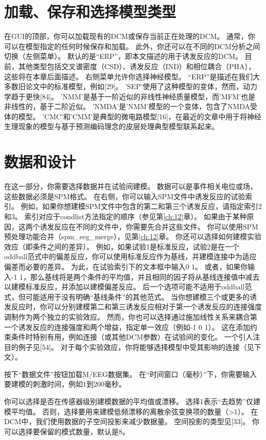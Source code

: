 \section{加载、保存和选择模型类型}

在GUI的顶部，你可以加载现有的DCM或保存当前正在处理的DCM。
通常，你可以在模型指定的任何时候保存和加载。
此外，你还可以在不同的DCM分析之间切换（左侧菜单）。
默认的是“ERP”，即本文描述的用于诱发反应的DCM。
目前，其他类型包括交叉谱密度（CSD）、诱发反应（IND）和相位耦合（PHA），这些将在本章后面描述。
右侧菜单允许你选择神经模型。
“ERP”是描述在我们大多数旧论文中的标准模型，例如[29]。
'SEP'使用了这种模型的变体，然而，动力学趋于更快[84]。
'NMM'是基于一阶近似的非线性神经质量模型，而'MFM'也是非线性的，基于二阶近似。
'NMDA'是'NMM'模型的一个变体，包含了NMDA受体的模型。
'CMC'和'CMM'是典型的微电路模型[16]，在最近的文章中用于将神经生理现象的模型与基于预测编码理念的皮层处理典型模型联系起来。


\section{数据和设计}

在这一部分，你需要选择数据并在试验间建模。
数据可以是事件相关电位或场，这些数据必须是SPM格式。
在右侧，你可以输入SPM文件中诱发反应的试验索引。
例如，如果你想建模SPM文件中包含的第二和第三个诱发反应，请指定索引2和3。
索引对应于condlist方法指定的顺序（参见第\ref{ch:12}章）。
如果由于某种原因，这两个诱发反应在不同的文件中，你需要先合并这些文件。
你可以使用SPM预处理功能合并（spm\_eeg\_merge），见第\ref{ch:12}章。
你还可以选择如何建模实验效应（即条件之间的差异）。
例如，如果试验1是标准反应，试验2是在一个oddball范式中的偏差反应，你可以使用标准反应作为基线，并建模连接中为适应偏差而必要的差异。
为此，在试验索引下的文本框中输入0 1。
或者，如果你输入-1 1，那么基线将是两个条件的平均值，并且相同的因子将从基线连接值中减去以建模标准反应，并添加以建模偏差反应。
后一个选项可能不适用于oddball范式，但可能适用于没有明确“基线条件”的其他范式。
当你想建模三个或更多的诱发反应时，你可以分别建模第二和第三诱发反应相对于第一个诱发反应的连接强度调制作为两个独立的实验效应。
然而，你也可以选择通过施加线性关系来耦合第一个诱发反应的连接强度和两个增益，指定单一效应（例如-1 0 1）。
这在添加约束条件时特别有用，例如连接（或其他DCM参数）在试验间的变化。
一个引人注目的例子见[54]。
对于每个实验效应，你将能够选择模型中受其影响的连接（见下文）。

按下“数据文件”按钮加载M/EEG数据集。
在“时间窗口（毫秒）”下，你需要输入要建模的刺激时间，例如1到200毫秒。

你可以选择是否在传感器级别建模数据的平均值或漂移。
选择1表示“去趋势”仅建模平均值。
否则，选择要用来建模低频漂移的离散余弦变换项的数量（>1）。
在DCM中，我们使用数据的子空间投影来减少数据量。
空间投影的类型见[33]。
你可以选择要保留的模式数量，默认是8。

